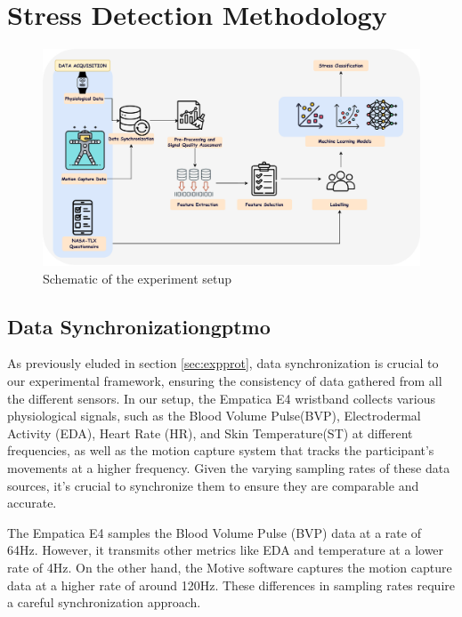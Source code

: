 \chapter{Stress Detection Methodology}


\begin{figure}[!htbp]
	\centering
	\includegraphics[width=\columnwidth]{images/schematic.pdf}
	\caption{Schematic of the experiment setup}
	\label{fig:netwrok}
\end{figure}

\section{Data Synchronization\gls*{gptmo}} \label{sec:synchronization} 
As previously eluded in section \ref{sec:expprot}, data synchronization is crucial to our experimental framework, ensuring the consistency
of data gathered from all the different sensors. In our setup, the Empatica E4 wristband collects various physiological signals, such as the Blood Volume Pulse(BVP), Electrodermal Activity (EDA), Heart Rate (HR), and Skin Temperature(ST) at different frequencies, as well as the motion capture system that tracks the participant's movements at a higher frequency. Given the varying sampling rates of these data sources, it's crucial to synchronize them to ensure they are comparable and accurate.

The Empatica E4 samples the Blood Volume Pulse (BVP) data at a rate of 64Hz. However, it transmits other metrics like EDA and temperature at a lower rate of 4Hz. On the other hand, the Motive software captures the motion capture data at a higher rate of around 120Hz. These differences in sampling rates require a careful synchronization approach.

